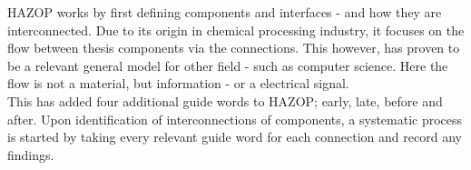 \documentclass[10pt,oneside]{book}                  %
\begin{document}

HAZOP works by first defining components and interfaces - and how they are interconnected. Due to its origin in chemical processing industry, it focuses on the flow between thesis components via the connections. This however, has proven to be a relevant general model for other field - such as computer science. Here the flow is not a material, but information - or a electrical signal.\\
This has added four additional guide words to HAZOP; early, late, before and after.
Upon identification of interconnections of components, a systematic process is started by taking every relevant guide word for each connection and record any findings.
\end{document}

